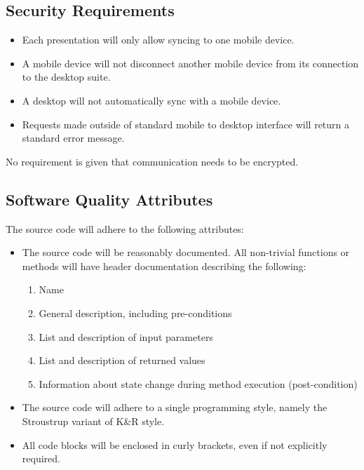 \documentclass{article}
\begin{document}
\subsection{Security Requirements}
\begin{itemize}
    \item Each presentation will only allow syncing to one mobile device.
    \item A mobile device will not disconnect another mobile device from its connection to the desktop suite.
    \item A desktop will not automatically sync with a mobile device.
    \item Requests made outside of standard mobile to desktop interface will return a standard error message.
\end{itemize}
No requirement is given that communication needs to be encrypted.\\

\subsection{Software Quality Attributes}
The source code will adhere to the following attributes:
\begin{itemize}
    \item The source code will be reasonably documented.  All non-trivial functions or methods will have header documentation describing the following:
        \begin{enumerate}
            \item Name
            \item General description, including pre-conditions
            \item List and description of input parameters
            \item List and description of returned values
            \item Information about state change during method execution (post-condition)
        \end{enumerate}
    \item The source code will adhere to a single programming style, namely the Stroustrup variant of K\&R style.
    \item All code blocks will be enclosed in curly brackets, even if not explicitly required.
\end{itemize}
\end{document}
